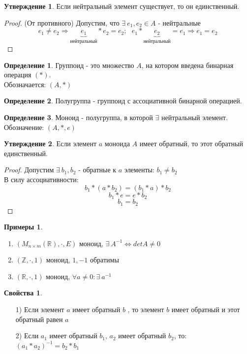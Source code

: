 \documentclass[a4paper, 12pt]{article}
\newcommand{\R}{\mathbb R}
\newcommand{\Z}{\mathbb Z}
\newcommand\tab[1][.5cm]{\hspace*{#1}}
\theoremstyle{definition}
\newtheorem*{definition}{Определение}
\newtheorem*{subtheorem}{Утверждение}
\newtheorem*{example}{Примеры}
\newtheorem*{properties}{Свойства}
\begin{document}
  \begin{subtheorem}
    Если нейтральный элемент существует, то он единственный. 
  \end{subtheorem} 
  \begin{proof}
    (От противного) Допустим, что $\exists \ e_1,e_2 \in A$ - нейтральные
    $$e_1 \not = e_2 \Longrightarrow \underbrace{e_1}_{\text{нейтральный}}* e_2 = e_2; \ \ \ e_1 * \underbrace{e_2}_{\text{нейтральный}}= e_1 \Longrightarrow e_1 = e_2$$ 
  \end{proof} 
  \begin{definition}
    Группоид - это множество $A$, на котором введена бинарная операция $(*)$. \\
    Обозначается: $(A,*)$  
  \end{definition} 
  \begin{definition}
    Полугруппа - группоид с ассоциативной бинарной операцией.
  \end{definition} 
  \begin{definition}
    Моноид - полугруппа, в которой $\exists $ нейтральный элемент.\\ Обозначение: $(A,*,e)$ 
  \end{definition} 
  \begin{subtheorem}
    Если элемент $a$ моноида $A$ имеет обратный, то этот обратный единственный. 
  \end{subtheorem}
  \begin{proof}
    Допустим $\exists \ b_1,b_2$ - обратные к $a$ элементы: $b_1 \not = b_2$ \\
    В силу ассоциативности:
    $$b_1 * (a * b_2) = (b_1 * a) * b_2$$
    $$b_1 * e = e * b_2$$ 
    $$b_1 = b_2$$ 
  \end{proof} 
  \begin{example}
    \begin{enumerate} \tab
      \item $(M_{n \times m}(\R), \cdot, E)$ моноид, $\exists \ A^{-1} \Longleftrightarrow detA \not = 0$ 
      \item $(\Z, \cdot, 1)$ моноид, $1, -1$ обратимы  
      \item $(\R, \cdot, 1)$ моноид, $\forall a \not =0:  \exists \ a^{-1}$ 
    \end{enumerate}
  \end{example}
  \begin{properties}
    \begin{itemize} \tab
      \item[1)] Если элемент $a$  имеет обратный $b$ , то элемент $b$ имеет обратный и этот обратный равен $a$
      \item[2)] Если $a_1$ имеет обратный $b_1$, $a_2$ имеет обратный $b_2$, то: $(a_1*a_2)^{-1} = b_2*b_1$ 
    \end{itemize}
  \end{properties}
\end{document}
